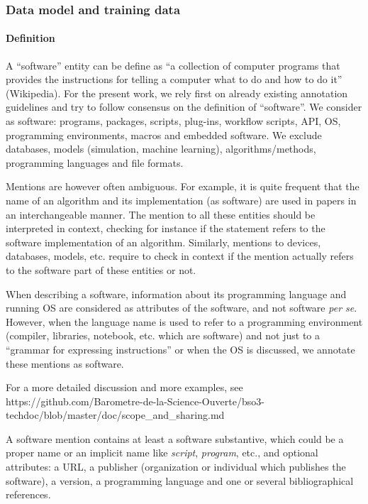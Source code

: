 \documentclass[
]{article}
\begin{document}
\hypertarget{data-model-and-training-data}{%
\subsubsection{Data model and training
data}\label{data-model-and-training-data}}

\hypertarget{definition}{%
\paragraph{Definition}\label{definition}}

A ``software'' entity can be define as ``a collection of computer
programs that provides the instructions for telling a computer what to
do and how to do it'' (Wikipedia). For the present work, we rely first
on already existing annotation guidelines and try to follow consensus on
the definition of ``software''. We consider as software: programs,
packages, scripts, plug-ins, workflow scripts, API, OS, programming
environments, macros and embedded software. We exclude databases, models
(simulation, machine learning), algorithms/methods, programming
languages and file formats.

Mentions are however often ambiguous. For example, it is quite frequent
that the name of an algorithm and its implementation (as software) are
used in papers in an interchangeable manner. The mention to all these
entities should be interpreted in context, checking for instance if the
statement refers to the software implementation of an algorithm.
Similarly, mentions to devices, databases, models, etc. require to check
in context if the mention actually refers to the software part of these
entities or not.

When describing a software, information about its programming language
and running OS are considered as attributes of the software, and not
software \emph{per se}. However, when the language name is used to refer
to a programming environment (compiler, libraries, notebook, etc. which
are software) and not just to a ``grammar for expressing instructions''
or when the OS is discussed, we annotate these mentions as software.

For a more detailed discussion and more examples, see
https://github.com/Barometre-de-la-Science-Ouverte/bso3-techdoc/blob/master/doc/scope\_and\_sharing.md

A software mention contains at least a software substantive, which could
be a proper name or an implicit name like \emph{script}, \emph{program},
etc., and optional attributes: a URL, a publisher (organization or
individual which publishes the software), a version, a programming
language and one or several bibliographical references.
\end{document}
